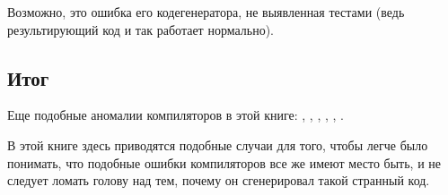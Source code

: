 Возможно, это ошибка его кодегенератора, не выявленная тестами 
(ведь результирующий код и так работает нормально).

\subsection{Итог}

Еще подобные аномалии компиляторов в этой книге: 
, , ,
,
,
.

В этой книге здесь приводятся подобные случаи для того, чтобы легче было понимать, 
что подобные ошибки компиляторов 
все же имеют место быть, и не следует ломать голову над тем, почему он сгенерировал такой странный код.%

